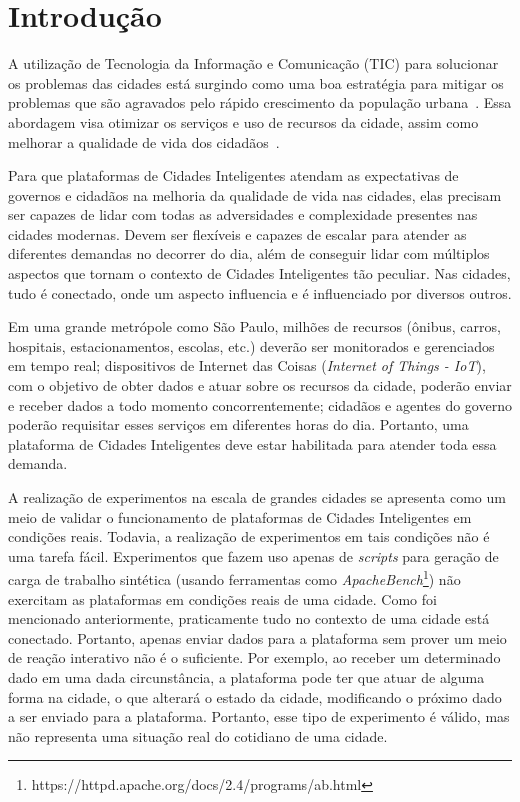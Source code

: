 \chapter{Introdução}
\label{cap:introducao}


A utilização de Tecnologia da Informação e Comunicação (TIC) para solucionar os problemas das cidades está surgindo como uma boa estratégia para mitigar os problemas que são agravados pelo rápido crescimento da população urbana~\cite{chourabi_2012}.
Essa abordagem visa otimizar os serviços e uso de recursos da cidade, assim como melhorar a qualidade de vida dos cidadãos~\cite{santana_2016}.

Para que plataformas de Cidades Inteligentes atendam as expectativas de governos e cidadãos na melhoria da qualidade de vida nas cidades, elas precisam ser capazes de lidar com todas as adversidades e
complexidade presentes nas cidades modernas.
Devem ser flexíveis e capazes de escalar para atender as diferentes demandas no decorrer do dia, além de conseguir lidar com múltiplos aspectos que tornam o contexto de Cidades Inteligentes tão
peculiar.
Nas cidades, tudo é conectado, onde um aspecto influencia e é influenciado por diversos outros.

Em uma grande metrópole como São Paulo, milhões de recursos (ônibus, carros, hospitais, estacionamentos, escolas, etc.) deverão ser monitorados e gerenciados em tempo real;
dispositivos de Internet das Coisas (\textit{Internet of Things - IoT}), com o objetivo de obter dados e atuar sobre os recursos da cidade, poderão enviar e receber dados a todo momento concorrentemente;
cidadãos e agentes do governo poderão requisitar esses serviços em diferentes horas do dia.
Portanto, uma plataforma de Cidades Inteligentes deve estar habilitada para atender toda essa demanda.

A realização de experimentos na escala de grandes cidades se apresenta como um meio de validar o funcionamento de plataformas de Cidades Inteligentes em condições reais.
Todavia, a realização de experimentos em tais condições não é uma tarefa fácil.
Experimentos que fazem uso apenas de \textit{scripts} para geração de carga de trabalho sintética (usando ferramentas como \textit{ApacheBench}\footnote{https://httpd.apache.org/docs/2.4/programs/ab.html})
não exercitam as plataformas em condições reais de uma cidade.
Como foi mencionado anteriormente, praticamente tudo no contexto de uma cidade está conectado.
Portanto, apenas enviar dados para a plataforma sem prover um meio de reação interativo não é o suficiente.
Por exemplo, ao receber um determinado dado em uma dada circunstância, a plataforma pode ter que atuar de alguma forma na cidade, o que alterará o estado da cidade, modificando o próximo dado a ser enviado 
para a plataforma.
Portanto, esse tipo de experimento é válido, mas não representa uma situação real do cotidiano de uma cidade.

